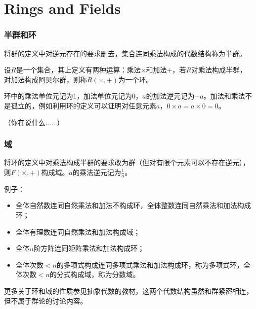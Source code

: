 \documentclass[CJK]{beamer}
\begin{document}
\section{Rings and Fields}
\begin{frame}
\frametitle{\bch 半群和环 \ech}
\bch
将群的定义中对逆元存在的要求删去，集合连同乘法构成的代数结构称为半群。
\par
设$R$是一个集合，其上定义有两种运算：乘法$\times$和加法$+$，若$R$对乘法构成半群，对加法构成阿贝尔群，则称$R(\times,+)$为一个环。
\par
环中的乘法单位元记为1，加法单位元记为0，$a$的加法逆元记为$-a$。加法和乘法不是孤立的，例如利用环的定义可以证明对任意元素$a$，$0 \times a = a \times 0 = 0$。
\par
（你在说什么......）


\ech
\end{frame}

\begin{frame}
\frametitle{\bch 域 \ech}
\bch
将环的定义中对乘法构成半群的要求改为群（但对有限个元素可以不存在逆元），则$F(\times,+)$构成域。$a$的乘法逆元记为$\frac{1}{a}$。\par
例子：
\begin{itemize}
\item 全体自然数连同自然乘法和加法不构成环，全体整数连同自然乘法和加法构成环；
\item 全体有理数连同自然乘法和加法构成域；
\item 全体$n$阶方阵连同矩阵乘法和加法构成环；
\item 全体次数$<n$的多项式构成连同多项式乘法和加法构成环，称为多项式环，全体次数$<n$的分式构成域，称为分数域。
\end{itemize}
更多关于环和域的性质参见抽象代数的教材，这两个代数结构虽然和群紧密相连，但不属于群论的讨论内容。


\ech
\end{frame}
\end{document}
